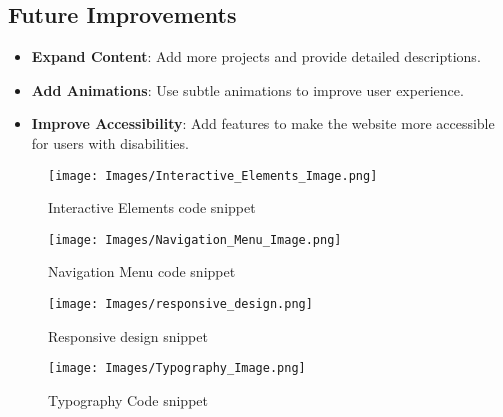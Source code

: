 \documentclass{article}
\begin{document}
\subsection*{Future Improvements}
\begin{itemize}
    \item \textbf{Expand Content}: Add more projects and provide detailed descriptions.
    \item \textbf{Add Animations}: Use subtle animations to improve user experience.
    \item \textbf{Improve Accessibility}: Add features to make the website more accessible for users with disabilities.
\end{itemize}

\begin{figure}
    \centering
    \texttt{[image: Images/Interactive\_Elements\_Image.png]}
    \caption{Interactive Elements code snippet}
    \label{fig:enter-label}
\end{figure}
\begin{figure}
    \centering
    \texttt{[image: Images/Navigation\_Menu\_Image.png]}
    \caption{Navigation Menu code snippet}
    \label{fig:enter-label}
\end{figure}
\begin{figure}
    \centering
    \texttt{[image: Images/responsive\_design.png]}
    \caption{Responsive design snippet}
    \label{fig:enter-label}
\end{figure}
\begin{figure}
    \centering
    \texttt{[image: Images/Typography\_Image.png]}
    \caption{Typography Code snippet}
    \label{fig:enter-label}
\end{figure}
\end{document}
